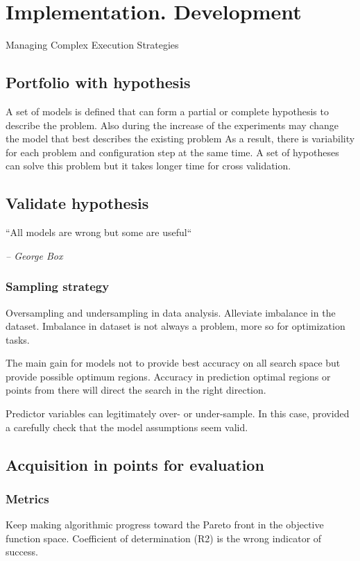 \chapter{Implementation. Development}
Managing Complex Execution Strategies

\section{Portfolio with hypothesis}
A set of models is defined that can form a partial or complete hypothesis to describe the problem.
Also during the increase of the experiments may change the model that best describes the existing problem
As a result, there is variability for each problem and configuration step at the same time. 
A set of hypotheses can solve this problem but it takes longer time for cross validation.

\section{Validate hypothesis}
    \epigraph{``All models are wrong but some are useful``}{\textit{– George Box}}

    \subsection{Sampling strategy}
    Oversampling and undersampling in data analysis. Alleviate imbalance in the dataset. 
    Imbalance in dataset is not always a problem, more so for optimization tasks. 

    The main gain for models not to provide best accuracy on all search space but provide possible optimum regions.
    Accuracy in prediction optimal regions or points from there will direct the search in the right direction.

    Predictor variables can legitimately over- or under-sample. 
    In this case, provided a carefully check that the model assumptions seem valid.

\section{Acquisition in points for evaluation}

    \subsection{Metrics}
    Keep making algorithmic progress toward the Pareto front in the objective function space.
    Coefficient of determination (R2) is the wrong indicator of success.

